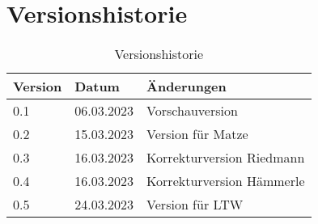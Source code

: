 \section*{Versionshistorie}

\begin{table}[H]
  \centering
  \begin{tabular}{lll}
    \toprule
    \textbf{Version} & \textbf{Datum} & \textbf{Änderungen}       \\
    \midrule
    0.1              & 06.03.2023     & Vorschauversion           \\
    0.2              & 15.03.2023     & Version für Matze         \\
    0.3              & 16.03.2023     & Korrekturversion Riedmann \\
    0.4              & 16.03.2023     & Korrekturversion Hämmerle \\
    0.5              & 24.03.2023     & Version für LTW           \\
    \bottomrule
  \end{tabular}
  \caption{Versionshistorie}
  \label{tab:versionshistorie}
\end{table}